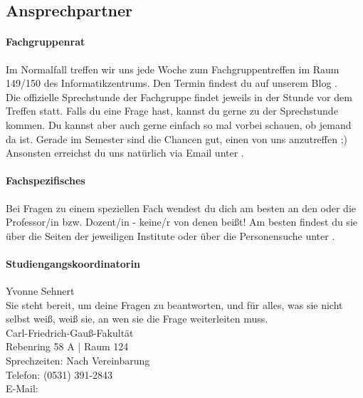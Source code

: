 
\subsection{Ansprechpartner}

	\paragraph{Fachgruppenrat}
		Im Normalfall treffen wir uns jede Woche zum Fachgruppentreffen im Raum 149/150 des Informatikzentrums. Den  Termin findest du auf unserem Blog \fginfoUrl. 
		\\
		Die offizielle Sprechstunde der Fachgruppe findet jeweils in der Stunde vor dem Treffen statt. Falls du eine Frage hast, kannst du gerne zu der Sprechstunde kommen. Du kannst aber auch gerne einfach so mal vorbei schauen, ob jemand da ist. Gerade im Semester sind die Chancen gut, einen von uns anzutreffen ;)
		\\
		Ansonsten erreichst du uns natürlich via Email unter . 

	\paragraph{Fachspezifisches}
		Bei Fragen zu einem speziellen Fach wendest du dich am
		besten an den oder die Professor/in bzw. Dozent/in -
		keine/r von denen beißt! Am besten findest du sie über die Seiten der jeweiligen Institute 
		oder über die Personensuche unter .

	\noindent\begin{minipage}{\columnwidth}
	\paragraph{Studiengangskoordinatorin}
	Yvonne Sehnert \\
	Sie steht bereit, um deine Fragen zu beantworten, und für alles, was sie nicht selbst weiß, weiß sie, an wen sie die Frage weiterleiten muss.\\
	Carl-Friedrich-Gauß-Fakultät\\
	Rebenring 58 A | Raum 124\\
	Sprechzeiten: Nach  Vereinbarung\\
	Telefon: (0531) 391-2843\\
	E-Mail: 
	\end{minipage}

